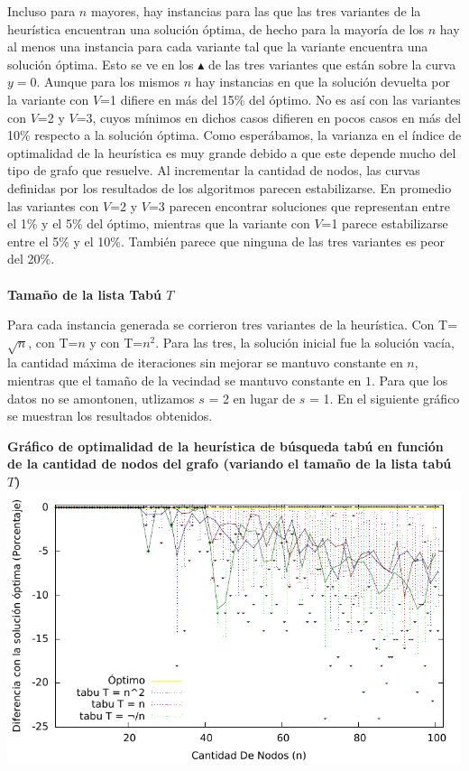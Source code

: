\par{Incluso para $n$ mayores, hay instancias para las que las tres variantes de
la heurística encuentran una solución óptima, de hecho para la mayoría de los $n$
hay al menos una instancia para cada variante tal que la variante encuentra
una solución óptima. Esto se ve en los $\blacktriangle$ de las tres variantes
que están sobre la curva $y=0$. Aunque para los mismos $n$ hay instancias en
que la solución devuelta por la variante con $V$=1 difiere en más del 15\% del
óptimo. No es así con las variantes con $V$=2 y $V$=3, cuyos mínimos
en dichos casos difieren en pocos casos en más del 10\% respecto a la solución
óptima. Como esperábamos, la varianza en el índice de optimalidad de la heurística
es muy grande debido a que este depende mucho del tipo de grafo que resuelve.
Al incrementar la cantidad de nodos, las curvas definidas por los resultados de
los algoritmos parecen estabilizarse. En promedio las variantes con $V$=2 y
$V$=3 parecen encontrar soluciones que representan entre el 1\% y el 5\% del
óptimo, mientras que la variante con $V$=1 parece estabilizarse entre el 5\% y
el 10\%. También parece que ninguna de las tres variantes es peor del 20\%.}
\\\\
\textbf{Tamaño de la lista Tabú $T$}\\

\par{Para cada instancia generada se corrieron tres variantes de la heurística.
Con T=$\sqrt{n}$, con T=$n$ y con T=$n^2$. Para las tres, la
solución inicial fue la solución vacía, la cantidad máxima de iteraciones sin
mejorar se mantuvo constante en $n$, mientras que el tamaño de la vecindad se
mantuvo constante en $1$. Para que los datos no se amontonen, utlizamos $s$ = 2
en lugar de $s$ = 1.
En el siguiente gráfico se muestran los resultados obtenidos.}
\newpage
\begin{center}
\textbf{Gráfico de optimalidad de la heurística de búsqueda tabú
en función\\de la cantidad de nodos del grafo (variando el tamaño de la
lista tabú $T$)}
\includegraphics[scale=1.3]{imgs/opt_tabu_T_100_2_10.pdf}
\end{center}

